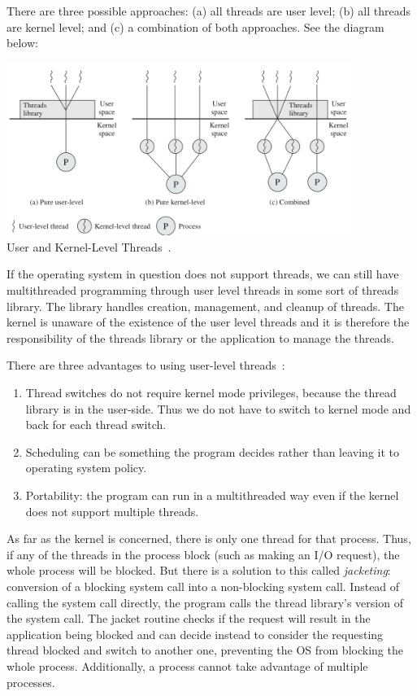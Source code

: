 There are three possible approaches: (a) all threads are user level; (b) all threads are kernel level; and (c) a combination of both approaches. See the diagram below:

\begin{center}
	\includegraphics[width=0.85\textwidth]{images/thread-types.png}\\
	User and Kernel-Level Threads~\cite{osi}.
\end{center}


If the operating system in question does not support threads, we can still have multithreaded programming through user level threads in some sort of threads library. The library handles creation, management, and cleanup of threads. The kernel is unaware of the existence of the user level threads and it is therefore the responsibility of the threads library or the application to manage the threads. 

There are three advantages to using user-level threads~\cite{osi}:
\begin{enumerate}
	\item Thread switches do not require kernel mode privileges, because the thread library is in the user-side. Thus we do not have to switch to kernel mode and back for each thread switch.
	\item Scheduling can be something the program decides rather than leaving it to operating system policy. 
	\item Portability: the program can run in a multithreaded way even if the kernel does not support multiple threads.
\end{enumerate}

As far as the kernel is concerned, there is only one thread for that process. Thus, if any of the threads in the process block (such as making an I/O request), the whole process will be blocked. But there is a solution to this called \textit{jacketing}: conversion of a blocking system call into a non-blocking system call. Instead of calling the system call directly, the program calls the thread library's version of the system call. The jacket routine checks if the request will result in the application being blocked and can decide instead to consider the requesting thread blocked and switch to another one, preventing the OS from blocking the whole process. Additionally, a process cannot take advantage of multiple processes.

